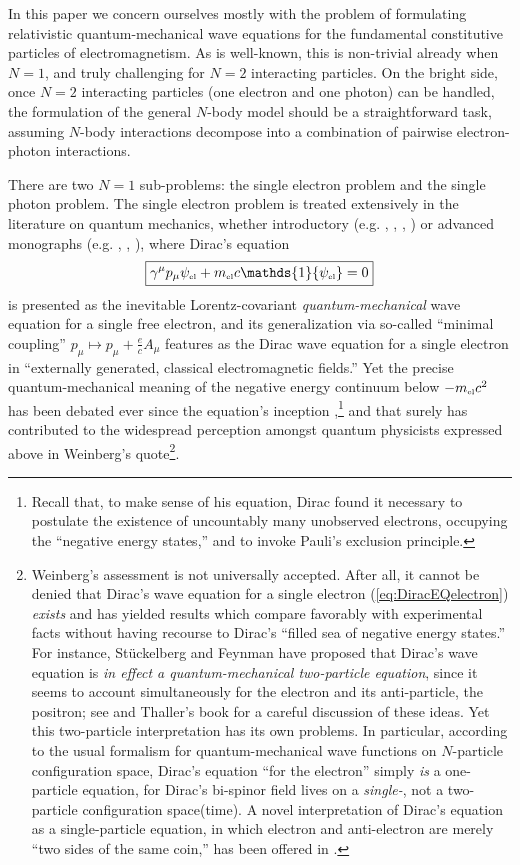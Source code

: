 \documentclass[12pt]{article}
\theoremstyle{definition}
\newcommand{\refeq}[1]{(\ref{#1})}
\numberwithin{equation}{section}
\newcommand{\beq}{\begin{equation}}
\newcommand{\eeq}{\end{equation}}
\newcommand{\Id}{\mathds{1}}
\newcommand{\psiEL}{{\psi_{\mbox{\rm\tiny el}}}}
\newcommand{\mEL}{{m_{\mbox{\rm\tiny el}}}}
\newcommand{\ga}{\gamma}
\begin{document}
 In this paper we concern ourselves mostly with the problem of formulating relativistic quantum-mechanical wave equations for
the fundamental constitutive particles of electromagnetism.
 As is well-known, this is non-trivial already when $N=1$, and truly challenging for $N=2$ interacting particles. 
 On the bright side,  once $N=2$ interacting particles (one electron and one photon) can be handled, the formulation of the 
general $N$-body model should be a straightforward task, assuming $N$-body interactions decompose into a combination of pairwise 
electron-photon interactions.

 There are two $N=1$ sub-problems: the single electron problem and the single photon problem.
 The single electron problem is treated extensively in the literature on quantum mechanics,
whether introductory (e.g. \cite{Dirac1930}, \cite{LandauLifshitzBOOKrelQM}, \cite{BohmBOOKonQM}, \cite{MessiahQMbook}) 
or advanced monographs (e.g. \cite{GreinerETal}, \cite{ThallerBOOK}, \cite{WeinbergBOOKqft}), 
where Dirac's equation \cite{Dirac1928a,Dirac1928b} 
\beq \label{eq:DiracEQelectron} 
\boxed{\ga^\mu p_\mu \psiEL + \mEL c \Id \psiEL =0}
\eeq
is presented as the inevitable Lorentz-covariant \emph{quantum-mechanical} wave equation for a single free electron,
and its generalization via so-called ``minimal coupling'' $p_\mu\mapsto p_\mu + \frac{e}{c}A_\mu$ features as the Dirac wave 
equation for a single electron in ``externally generated, classical electromagnetic fields.'' 
 Yet the precise quantum-mechanical meaning of the negative energy continuum below $-\mEL c^2$ 
has been debated ever since the equation's inception \cite{Dirac1928a,Dirac1928b},\footnote{Recall 
  that, to make sense of his equation, Dirac found it necessary to postulate the existence of uncountably many unobserved
 electrons, occupying the ``negative energy states,'' and to invoke Pauli's exclusion principle.}
and that surely has contributed to the widespread perception amongst quantum physicists expressed above in Weinberg's quote\footnote{Weinberg's assessment is not universally accepted. After all, it cannot be denied that Dirac's wave equation 
for a single electron \refeq{eq:DiracEQelectron} \emph{exists} and has yielded results which compare 
favorably with experimental facts without having recourse to Dirac's ``filled sea of negative energy states.''
 For instance, St\"uckelberg \cite{Stueckelberg} and Feynman \cite{FeynmanD} have proposed that Dirac's wave equation is 
\emph{in effect a quantum-mechanical two-particle equation}, since it seems to account simultaneously for the electron and its 
anti-particle, the positron; see \cite{Thaller} and Thaller's book \cite{ThallerBOOK} for a careful discussion of these ideas. 
 Yet this two-particle interpretation has its own problems. 
 In particular, according to the usual formalism for quantum-mechanical wave functions on $N$-particle configuration space,
Dirac's equation ``for the electron'' simply \emph{is} a one-particle equation, for Dirac's bi-spinor field lives on a 
  \emph{single-}, not a two-particle configuration space(time). 
 A novel interpretation of Dirac's equation as a single-particle equation, in which electron and anti-electron are merely
``two sides of the same coin,'' has been offered in \cite{KTZzGKNDiia}.}.
\end{document}
